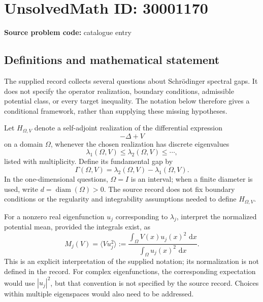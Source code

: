 \documentclass[11pt]{article}
\newcommand{\dd}{\,\mathrm{d}}
\begin{document}
\section*{UnsolvedMath ID: 30001170}
\textbf{Source problem code:} catalogue entry
\subsection{Definitions and mathematical statement}
The supplied record collects several questions about Schrödinger spectral gaps. It does not specify the operator realization, boundary conditions, admissible potential class, or every target inequality. The notation below therefore gives a conditional framework, rather than supplying these missing hypotheses.

Let \(H_{\Omega,V}\) denote a self-adjoint realization of the differential expression
\[
-\Delta+V
\]
on a domain \(\Omega\), whenever the chosen realization has discrete eigenvalues
\[
\lambda_1(\Omega,V)\leq\lambda_2(\Omega,V)\leq\cdots,
\]
listed with multiplicity. Define its fundamental gap by
\[
\Gamma(\Omega,V)=\lambda_2(\Omega,V)-\lambda_1(\Omega,V).
\]
In the one-dimensional questions, \(\Omega=I\) is an interval; when a finite diameter is used, write \(d=\operatorname{diam}(\Omega)>0\). The source record does not fix boundary conditions or the regularity and integrability assumptions needed to define \(H_{\Omega,V}\).

For a nonzero real eigenfunction \(u_j\) corresponding to \(\lambda_j\), interpret the normalized potential mean, provided the integrals exist, as
\[
M_j(V)=\langle Vu_j^2\rangle
:=\frac{\displaystyle\int_\Omega V(x)u_j(x)^2\,\dd x}
{\displaystyle\int_\Omega u_j(x)^2\,\dd x}.
\]
This is an explicit interpretation of the supplied notation; its normalization is not defined in the record. For complex eigenfunctions, the corresponding expectation would use \(|u_j|^2\), but that convention is not specified by the source record. Choices within multiple eigenspaces would also need to be addressed.
\end{document}
